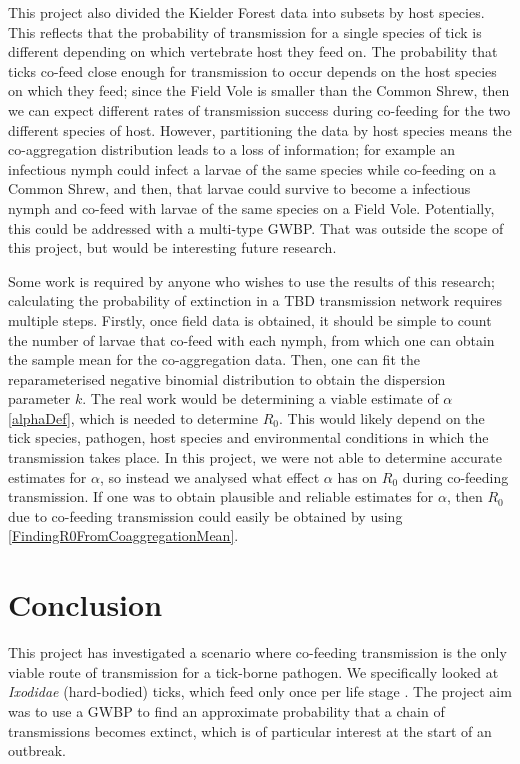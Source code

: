 \documentclass{article}
\begin{document}
This project also divided the Kielder Forest data into subsets by host species. This reflects that the probability of transmission for a single species of tick is different depending on which vertebrate host they feed on. The probability that ticks co-feed close enough for transmission to occur depends on the host species on which they feed; since the Field Vole is smaller than the Common Shrew, then we can expect different rates of transmission success during co-feeding for the two different species of host. However, partitioning the data by host species means the co-aggregation distribution leads to a loss of information; for example an infectious nymph could infect a larvae of the same species while co-feeding on a Common Shrew, and then, that larvae could survive to become a infectious nymph and co-feed with larvae of the same species on a Field Vole. Potentially, this could be addressed with a multi-type GWBP. That was outside the scope of this project, but would be interesting future research.

Some work is required by anyone who wishes to use the results of this research; calculating the probability of extinction in a TBD transmission network requires multiple steps. Firstly, once field data is obtained, it should be simple to count the number of larvae that co-feed with each nymph, from which one can obtain the sample mean for the co-aggregation data. Then, one can fit the reparameterised negative binomial distribution to obtain the dispersion parameter $ k $. The real work would be determining a viable estimate of $ \alpha $ \eqref{alphaDef}, which is needed to determine $ R_0 $. This would likely depend on the tick species, pathogen, host species and environmental conditions in which the transmission takes place. In this project, we were not able to determine accurate estimates for $ \alpha $, so instead we analysed what effect $ \alpha $ has on $ R_0 $ during co-feeding transmission. If one was to obtain plausible and reliable estimates for $ \alpha $, then $ R_0 $ due to co-feeding transmission could easily be obtained by using \eqref{FindingR0FromCoaggregationMean}.

\newpage

\section{Conclusion}

This project has investigated a scenario where co-feeding transmission is the only viable route of transmission for a tick-borne pathogen. We specifically looked at \textit{Ixodidae} (hard-bodied) ticks, which feed only once per life stage \cite{}. The project aim was to use a GWBP to find an approximate probability that a chain of transmissions becomes extinct, which is of particular interest at the start of an outbreak.
\end{document}
